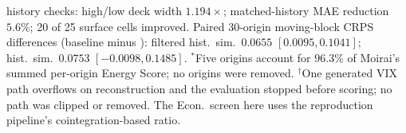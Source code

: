 \begin{table}[H]
\vspace{2pt}
\begin{minipage}{0.99\linewidth}
\tiny\raggedright \scenarioflow{} history checks: high/low deck width $1.194\times$; matched-history MAE reduction $5.6\%$; 20 of 25 surface cells improved. Paired 30-origin moving-block CRPS differences (baseline minus \scenarioflow{}): filtered hist.\ sim.\ $0.0655$ $[0.0095, 0.1041]$; hist.\ sim.\ $0.0753$ $[-0.0098, 0.1485]$. $^\ast$Five origins account for $96.3\%$ of Moirai's summed per-origin Energy Score; no origins were removed. $^\dagger$One generated VIX path overflows on reconstruction and the evaluation stopped before scoring; no path was clipped or removed. The Econ.\ screen here uses the reproduction pipeline's cointegration-based ratio.
\end{minipage}
\end{table}
